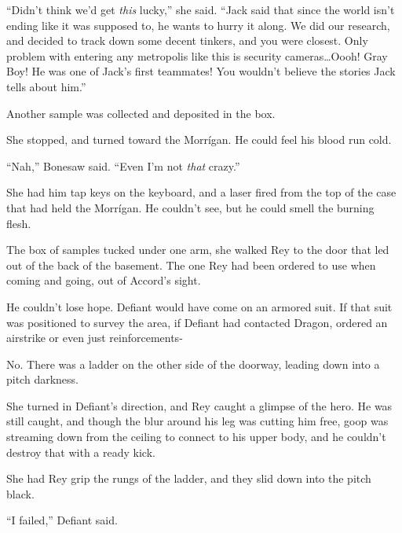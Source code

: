 ``Didn't think we'd get \emph{this} lucky,'' she said.  ``Jack said that since the world isn't ending like it was supposed to, he wants to hurry it along.  We did our research, and decided to track down some decent tinkers, and you were closest.  Only problem with entering any metropolis like this is security cameras\ldots Oooh!  Gray Boy!  He was one of Jack's first teammates!  You wouldn't believe the stories Jack tells about him.''



Another sample was collected and deposited in the box.



She stopped, and turned toward the Morr\'{i}gan.  He could feel his blood run cold.



``Nah,'' Bonesaw said.  ``Even I'm not \emph{that} crazy.''



She had him tap keys on the keyboard, and a laser fired from the top of the case that had held the Morr\'{i}gan.  He couldn't see, but he could smell the burning flesh.



The box of samples tucked under one arm, she walked Rey to the door that led out of the back of the basement.  The one Rey had been ordered to use when coming and going, out of Accord's sight.



He couldn't lose hope.  Defiant would have come on an armored suit.  If that suit was positioned to survey the area, if Defiant had contacted Dragon, ordered an airstrike or even just reinforcements-



No.  There was a ladder on the other side of the doorway, leading down into a pitch darkness.



She turned in Defiant's direction, and Rey caught a glimpse of the hero.  He was still caught, and though the blur around his leg was cutting him free, goop was streaming down from the ceiling to connect to his upper body, and he couldn't destroy that with a ready kick.



She had Rey grip the rungs of the ladder, and they slid down into the pitch black.



\blacksquare



``I failed,'' Defiant said.



